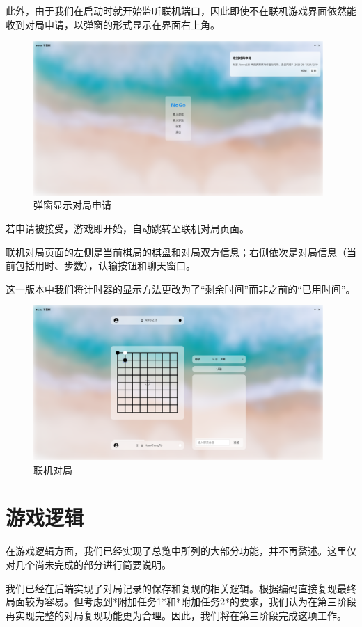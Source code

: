 \documentclass[UTF8]{ctexart}
\begin{document}
此外，由于我们在启动时就开始监听联机端口，因此即使不在联机游戏界面依然能收到对局申请，以弹窗的形式显示在界面右上角。\par
\begin{figure}[H]
	\centering
	\includegraphics[width=11cm]{Images/ReceiveResultAtHome.png}
	\caption{弹窗显示对局申请}
\end{figure}
若申请被接受，游戏即开始，自动跳转至联机对局页面。\par
联机对局页面的左侧是当前棋局的棋盘和对局双方信息；右侧依次是对局信息（当前包括用时、步数），认输按钮和聊天窗口。\par
这一版本中我们将计时器的显示方法更改为了“剩余时间”而非之前的“已用时间”。\par
\begin{figure}[H]
	\centering
	\includegraphics[width=11cm]{Images/OnlineGame.png}
	\caption{联机对局}
\end{figure}
\section{游戏逻辑}

在游戏逻辑方面，我们已经实现了总览中所列的大部分功能，并不再赘述。这里仅对几个尚未完成的部分进行简要说明。\par
我们已经在后端实现了对局记录的保存和复现的相关逻辑。根据编码直接复现最终局面较为容易。但考虑到*附加任务1*和*附加任务2*的要求，我们认为在第三阶段再实现完整的对局复现功能更为合理。因此，我们将在第三阶段完成这项工作。\par
\end{document}
